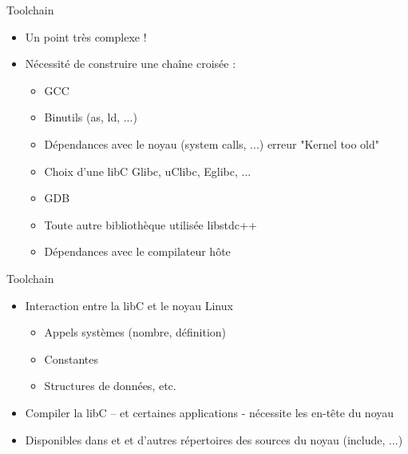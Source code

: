 \begin{frame}{Toolchain}{}
  \begin{itemize}
  \item Un point très complexe !
  \item Nécessité de construire une chaîne croisée :
    \begin{itemize}
    \item GCC
    \item Binutils (as, ld, ...)
    \item Dépendances avec le noyau (system calls, ...) \MVRightarrow erreur "Kernel too old"
    \item Choix d'une libC \MVRightarrow Glibc, uClibc, Eglibc, ...
    \item GDB
    \item Toute autre bibliothèque utilisée \MVRightarrow libstdc++
    \item Dépendances avec le compilateur hôte
    \end{itemize}
  \end{itemize}
\end{frame}

\begin{frame}{Toolchain}{}
  \begin{itemize}
  \item Interaction entre la libC et le noyau Linux
    \begin{itemize}
    \item Appels systèmes (nombre, définition)
    \item Constantes
    \item Structures de données, etc.
    \end{itemize}
  \item Compiler la libC – et certaines applications - nécessite les en-tête du noyau
  \item Disponibles dans  et  et d'autres répertoires des sources du noyau (include, ...)
  \end{itemize}
\end{frame}

